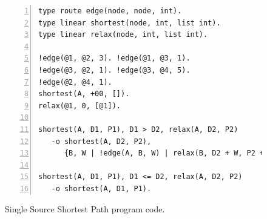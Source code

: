 \begin{figure}[ht]
\begin{Verbatim}[numbers=left]
type route edge(node, node, int).
type linear shortest(node, int, list int).
type linear relax(node, int, list int).

!edge(@1, @2, 3). !edge(@1, @3, 1).
!edge(@3, @2, 1). !edge(@3, @4, 5).
!edge(@2, @4, 1).
shortest(A, +00, []).
relax(@1, 0, [@1]).

shortest(A, D1, P1), D1 > D2, relax(A, D2, P2)
   -o shortest(A, D2, P2),
      {B, W | !edge(A, B, W) | relax(B, D2 + W, P2 ++ [B])}.

shortest(A, D1, P1), D1 <= D2, relax(A, D2, P2)
   -o shortest(A, D1, P1).
\end{Verbatim}
\caption{Single Source Shortest Path program code.}
\label{code:shortest_path_program}
\end{figure}

